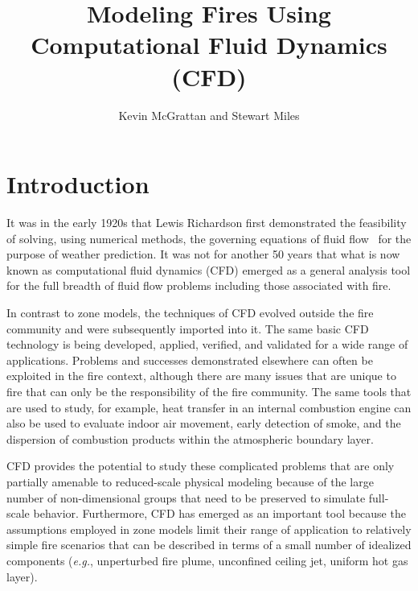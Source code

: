 \documentclass[graybox]{svmult}
\begin{document}


\title*{Modeling Fires Using Computational Fluid Dynamics (CFD)}

\author{Kevin McGrattan and Stewart Miles}


\maketitle


\section{Introduction}

It was in the early 1920s that Lewis Richardson first demonstrated the feasibility of solving, using numerical methods, the governing equations of fluid flow~\cite{Richardson}  for the purpose of weather prediction. It was not for another 50 years that what is now known as computational fluid dynamics (CFD) emerged as a general analysis tool for the full breadth of fluid flow problems including those associated with fire.

In contrast to zone models, the techniques of CFD evolved outside the fire community and were subsequently imported into it. The same basic CFD technology is being developed, applied, verified, and validated for a wide range of applications. Problems and successes demonstrated elsewhere can often be exploited in the fire context, although there are many issues that are unique to fire that can only be the responsibility of the fire community. The same tools that are used to study, for example, heat transfer in an internal combustion engine can also be used to evaluate indoor air movement, early detection of smoke, and the dispersion of combustion products within the atmospheric boundary layer.

CFD provides the potential to study these complicated problems that are only partially amenable to reduced-scale physical modeling because of the large number of non-dimensional groups that need to be preserved to simulate full-scale behavior. Furthermore, CFD has emerged as an important tool because the assumptions employed in zone models limit their range of application to relatively simple fire scenarios that can be described in terms of a small number of idealized components ({\em e.g.}, unperturbed fire plume, unconfined ceiling jet, uniform hot gas layer).
\end{document}
